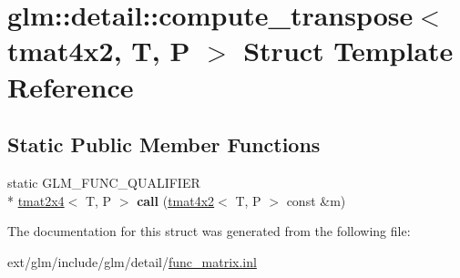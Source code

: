 \hypertarget{structglm_1_1detail_1_1compute__transpose_3_01tmat4x2_00_01_t_00_01_p_01_4}{\section{glm\-:\-:detail\-:\-:compute\-\_\-transpose$<$ tmat4x2, T, P $>$ Struct Template Reference}
\label{structglm_1_1detail_1_1compute__transpose_3_01tmat4x2_00_01_t_00_01_p_01_4}
}
\subsection*{Static Public Member Functions}
\begin{DoxyCompactItemize}
\item 
\hypertarget{structglm_1_1detail_1_1compute__transpose_3_01tmat4x2_00_01_t_00_01_p_01_4_a7c4f8fb4ae6caf6fc6794667b1e7ba0c}{static G\-L\-M\-\_\-\-F\-U\-N\-C\-\_\-\-Q\-U\-A\-L\-I\-F\-I\-E\-R \\*
\hyperlink{structglm_1_1tmat2x4}{tmat2x4}$<$ T, P $>$ {\bfseries call} (\hyperlink{structglm_1_1tmat4x2}{tmat4x2}$<$ T, P $>$ const \&m)}\label{structglm_1_1detail_1_1compute__transpose_3_01tmat4x2_00_01_t_00_01_p_01_4_a7c4f8fb4ae6caf6fc6794667b1e7ba0c}

\end{DoxyCompactItemize}


The documentation for this struct was generated from the following file\-:\begin{DoxyCompactItemize}
\item 
ext/glm/include/glm/detail/\hyperlink{func__matrix_8inl}{func\-\_\-matrix.\-inl}\end{DoxyCompactItemize}
